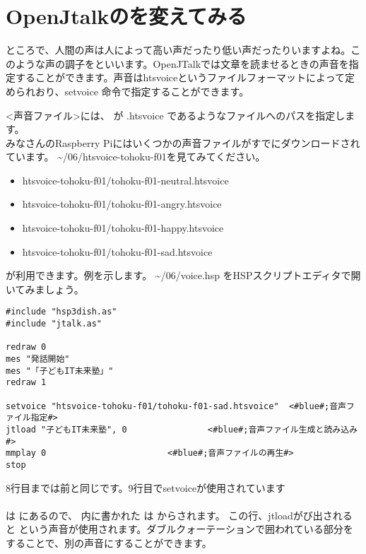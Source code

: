 \newpage
\section{OpenJtalkのを変えてみる}
ところで、人間の声は人によって高い声だったり低い声だったりいますよね。このような声の調子をといいます。OpenJTalkでは文章を読ませるときの声音を指定することができます。声音はhtsvoiceというファイルフォーマットによって定められおり、setvoice 命令で指定することができます。\\

<声音ファイル>には、 が .htsvoice であるようなファイルへのパスを指定します。\\
みなさんのRaspberry Piにはいくつかの声音ファイルがすでにダウンロードされています。  \textasciitilde /06/htsvoice-tohoku-f01を見てみてください。

\begin{itemize}
\item htsvoice-tohoku-f01/tohoku-f01-neutral.htsvoice
\item htsvoice-tohoku-f01/tohoku-f01-angry.htsvoice
\item htsvoice-tohoku-f01/tohoku-f01-happy.htsvoice
\item htsvoice-tohoku-f01/tohoku-f01-sad.htsvoice
\end{itemize}

が利用できます。例を示します。 \textasciitilde /06/voice.hsp をHSPスクリプトエディタで開いてみましょう。\\

\begin{lstlisting}[caption=voice.hsp,label=voice.hsp]
#include "hsp3dish.as"
#include "jtalk.as"

redraw 0
mes "発話開始"
mes "「子どもIT未来塾」"
redraw 1

setvoice "htsvoice-tohoku-f01/tohoku-f01-sad.htsvoice"	<#blue#;音声ファイル指定#>
jtload "子どもIT未来塾", 0				<#blue#;音声ファイル生成と読み込み#>
mmplay 0						<#blue#;音声ファイルの再生#>
stop
\end{lstlisting}

8行目までは前と同じです。9行目でsetvoiceが使用されています\\
\\
 は  にあるので、
 内に書かれた 
は  からされます。
この行、jtloadがび出されると 
という声音が使用されます。ダブルクォーテーションで囲われている部分をすることで、別の声音にすることができます。\\

\begin{tcolorbox}[title=\useOmetoi]
\begin{enumerate}
\end{enumerate}
\end{tcolorbox}

